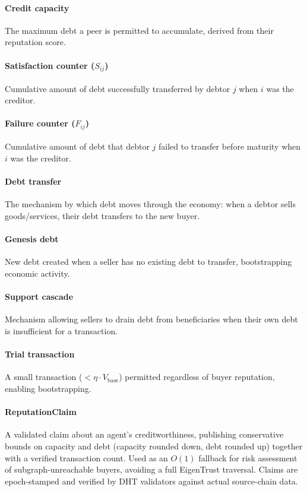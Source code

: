 \documentclass[11pt]{article}
\begin{document}
\paragraph{Credit capacity} The maximum debt a peer is permitted to accumulate, derived from their reputation score.
\paragraph{Satisfaction counter ($S_{ij}$)} Cumulative amount of debt successfully transferred by debtor $j$ when $i$ was the creditor.
\paragraph{Failure counter ($F_{ij}$)} Cumulative amount of debt that debtor $j$ failed to transfer before maturity when $i$ was the creditor.
\paragraph{Debt transfer} The mechanism by which debt moves through the economy: when a debtor sells goods/services, their debt transfers to the new buyer.
\paragraph{Genesis debt} New debt created when a seller has no existing debt to transfer, bootstrapping economic activity.
\paragraph{Support cascade} Mechanism allowing sellers to drain debt from beneficiaries when their own debt is insufficient for a transaction.
\paragraph{Trial transaction} A small transaction ($< \eta \cdot V_{\text{base}}$) permitted regardless of buyer reputation, enabling bootstrapping.
\paragraph{ReputationClaim} A validated claim about an agent's creditworthiness, publishing conservative bounds on capacity and debt (capacity rounded down, debt rounded up) together with a verified transaction count. Used as an $O(1)$ fallback for risk assessment of subgraph-unreachable buyers, avoiding a full EigenTrust traversal. Claims are epoch-stamped and verified by DHT validators against actual source-chain data.
\end{document}
